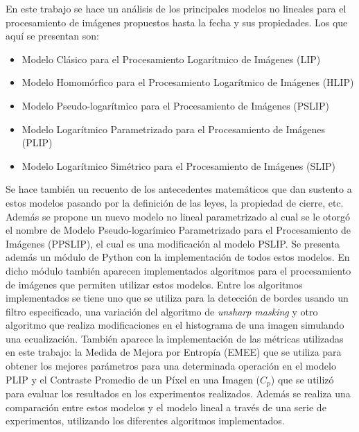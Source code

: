 \begin{resumen}
	En este trabajo se hace un an\'alisis de los principales modelos no lineales para el procesamiento de im\'agenes propuestos hasta la fecha y sus propiedades. Los que aqu\'i se presentan son:
	
	\begin{itemize}
		\item Modelo Cl\'asico para el Procesamiento Logar\'itmico de Im\'agenes (LIP)
		\item Modelo Homom\'orfico para el Procesamiento Logar\'itmico de Im\'agenes (HLIP)
		\item  Modelo Pseudo-logar\'itmico para el Procesamiento de Im\'agenes (PSLIP)
		\item Modelo Logar\'itmico Parametrizado para el Procesamiento de Im\'agenes (PLIP)
		\item Modelo  Logar\'itmico Sim\'etrico para el Procesamiento de Im\'agenes (SLIP)
	\end{itemize}
	
	Se hace tambi\'en un recuento de los antecedentes matem\'aticos que dan sustento a estos modelos pasando por la definici\'on de las leyes, la propiedad de cierre, etc. Adem\'as se propone un nuevo modelo no lineal parametrizado al cual se le otorg\'o el nombre de Modelo Pseudo-logar\'imico Parametrizado para el Procesamiento de Im\'agenes (PPSLIP), el cual es una modificaci\'on al modelo PSLIP. Se presenta adem\'as un m\'odulo de Python con la implementaci\'on de todos estos modelos. En dicho m\'odulo tambi\'en aparecen implementados algoritmos para el procesamiento de im\'agenes que permiten utilizar estos modelos. Entre los algoritmos implementados se tiene uno que se utiliza para la detecci\'on de bordes usando un filtro especificado, una variaci\'on del algoritmo de \textit{unsharp masking} y otro algoritmo que realiza modificaciones en el histograma de una imagen simulando una ecualizaci\'on. Tambi\'en aparece la implementaci\'on de las m\'etricas utilizadas en este trabajo: la Medida de Mejora por Entropía (EMEE) que se utiliza para obtener los mejores par\'ametros para una determinada operaci\'on en el modelo PLIP y el Contraste Promedio de un P\'ixel en una Imagen ($C_p$) que se utiliz\'o para evaluar los resultados en los experimentos realizados. Adem\'as se realiza una comparaci\'on entre estos modelos y el modelo lineal a trav\'es de una serie de experimentos, utilizando los diferentes algoritmos implementados.
\end{resumen}

